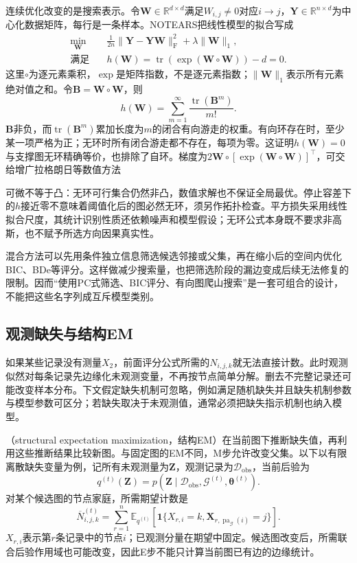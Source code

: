 连续优化改变的是搜索表示。令$\bm{W}\in\mathbb{R}^{d\times d}$满足$W_{i,j}\ne0$对应$i\to j$，$\bm{Y}\in\mathbb{R}^{n\times d}$为中心化数据矩阵，每行是一条样本。NOTEARS把线性模型的拟合写成
\begin{equation}
  \begin{aligned}
    \min_{\bm{W}}\quad&
      \frac{1}{2n}\lVert\bm{Y}-\bm{Y}\bm{W}\rVert_{\mathrm F}^{2}
      +\lambda\lVert\bm{W}\rVert_1,\\
    \text{满足}\quad&
      h(\bm{W})=
      \operatorname{tr}\!\left(\exp(\bm{W}\circ\bm{W})\right)-d=0.
  \end{aligned}
  \label{eq:pgm-structure-learning-notears}
\end{equation}
这里$\circ$为逐元素乘积，$\exp$是矩阵指数，不是逐元素指数；$\lVert\bm{W}\rVert_1$表示所有元素绝对值之和。令$\bm{B}=\bm{W}\circ\bm{W}$，则
\[
  h(\bm{W})=\sum_{m=1}^{\infty}
     \frac{\operatorname{tr}(\bm{B}^m)}{m!}.
\]
$\bm{B}$非负，而$\operatorname{tr}(\bm{B}^m)$累加长度为$m$的闭合有向游走的权重。有向环存在时，至少某一项严格为正；无环时所有闭合游走都不存在，每项为零。这证明$h(\bm{W})=0$与支撑图无环精确等价，也排除了自环。梯度为$2\bm{W}\circ[\exp(\bm{W}\circ\bm{W})]^{\top}$，可交给增广拉格朗日等数值方法

可微不等于凸：无环可行集合仍然非凸，数值求解也不保证全局最优。停止容差下的$h$接近零不意味着阈值化后的图必然无环，须另作拓扑检查。平方损失采用线性拟合尺度，其统计识别性质还依赖噪声和模型假设；无环公式本身既不要求非高斯，也不赋予所选方向因果真实性。

混合方法可以先用条件独立信息筛选候选邻接或父集，再在缩小后的空间内优化BIC、BDe等评分。这样做减少搜索量，也把筛选阶段的漏边变成后续无法修复的限制。因而“使用PC式筛选、BIC评分、有向图爬山搜索”是一套可组合的设计，不能把这些名字列成互斥模型类别。

\subsection{观测缺失与结构EM}
\label{sec:pgm-structure-learning-structural-em}

如果某些记录没有测量$X_2$，前面评分公式所需的$N_{i,j,k}$就无法直接计数。此时观测似然对每条记录先边缘化未观测变量，不再按节点简单分解。删去不完整记录还可能改变样本分布。下文假定缺失机制可忽略，例如满足随机缺失并且缺失机制参数与模型参数可区分；若缺失取决于未观测值，通常必须把缺失指示机制也纳入模型。

（structural expectation maximization，结构EM）在当前图下推断缺失值，再利用这些推断结果比较新图。与固定图的EM不同，M步允许改变父集。以下以有限离散缺失变量为例，记所有未观测量为$\bm{Z}$，观测记录为$\mathcal{D}_{\mathrm{obs}}$，当前后验为
\[
  q^{(t)}(\bm{Z})
  =p(\bm{Z}\mid\mathcal{D}_{\mathrm{obs}},
                  \mathcal{G}^{(t)},\bm{\theta}^{(t)}).
\]
对某个候选图的节点家庭，所需期望计数是
\[
  \overline N_{i,j,k}^{(t)}
  =\sum_{r=1}^{n}
    \mathbb{E}_{q^{(t)}}\!
      \left[\mathbf{1}\{X_{r,i}=k,
        \bm{X}_{r,\operatorname{pa}_{\mathcal{G}}(i)}=j\}\right].
\]
$X_{r,i}$表示第$r$条记录中的节点$i$；已观测分量在期望中固定。候选图改变后，所需联合后验作用域也可能改变，因此E步不能只计算当前图已有边的边缘统计。

